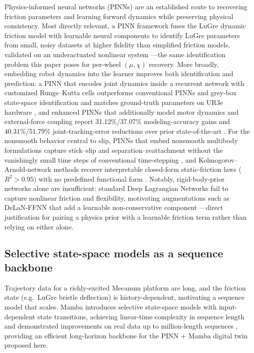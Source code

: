 \documentclass[11pt]{article}
\begin{document}
Physics-informed neural networks (PINNs) are an established route to recovering
friction parameters and learning forward dynamics while preserving physical
consistency. Most directly relevant, a PINN framework fuses the LuGre dynamic
friction model with learnable neural components to identify LuGre parameters from
small, noisy datasets at higher fidelity than simplified friction models, validated
on an underactuated nonlinear system \cite{ozmen2026lugre}---the same
identification problem this paper poses for per-wheel $(\mu,\chi)$ recovery. More
broadly, embedding robot dynamics into the learner improves both identification and
prediction: a PINN that encodes joint dynamics inside a recurrent network with
customized Runge--Kutta cells outperforms conventional PINNs and grey-box
state-space identification and matches ground-truth parameters on UR3e hardware
\cite{yang2023pinnjoint}, and enhanced PINNs that additionally model motor dynamics
and external-force coupling report 31.12\%/37.07\% modeling-accuracy gains and
40.31\%/51.79\% joint-tracking-error reductions over prior state-of-the-art
\cite{fitee2025pinn}. For the nonsmooth behavior central to slip, PINNs that embed
nonsmooth multibody formulations capture stick--slip and separation--reattachment
without the vanishingly small time steps of conventional time-stepping
\cite{li2023nonsmooth}, and Kolmogorov--Arnold-network methods recover interpretable
closed-form static-friction laws ($R^2 > 0.95$) with no predefined functional form
\cite{wang2025kan}. Notably, rigid-body-prior networks alone are insufficient:
standard Deep Lagrangian Networks fail to capture nonlinear friction and
flexibility, motivating augmentations such as DeLaN-FFNN that add a learnable
non-conservative component \cite{li2025compliant}---direct justification for pairing
a physics prior with a learnable friction term rather than relying on either alone.

\subsection{Selective state-space models as a sequence backbone}
\label{sec:related-ssm}

Trajectory data for a richly-excited Mecanum platform are long, and the friction
state (e.g.\ LuGre bristle deflection) is history-dependent, motivating a
sequence model that scales. Mamba introduces selective state-space models with
input-dependent state transitions, achieving linear-time complexity in sequence
length and demonstrated improvements on real data up to million-length sequences
\cite{gu2023mamba}, providing an efficient long-horizon backbone for the PINN +
Mamba digital twin proposed here.
\end{document}
